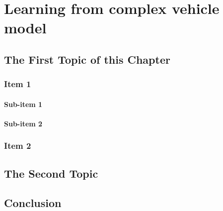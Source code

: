 \chapter{Learning from complex vehicle model}
\label{cha:Tracking_MPC}








\section{The First Topic of this Chapter}
\subsection{Item 1}
\subsubsection{Sub-item 1}


\subsubsection{Sub-item 2}


\subsection{Item 2}


\section{The Second Topic}


\section{Conclusion}

